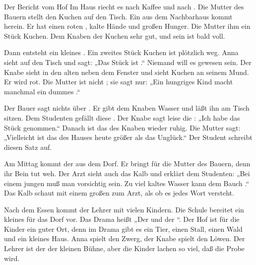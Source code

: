 \documentclass[12pt]{nextbook}
\begin{document}
\begin{readersection}{Der Bericht vom Hof}
Im Haus riecht es nach Kaffee und nach . Die Mutter des Bauern stellt den Kuchen auf den Tisch. Ein  aus dem Nachbarhaus kommt herein. Er hat einen roten , kalte Hände und großen Hunger. Die Mutter  ihm ein Stück Kuchen. Dem Knaben  der Kuchen sehr gut, und sein  ist bald voll.

Dann entsteht ein kleines . Ein zweites Stück Kuchen ist plötzlich weg. Anna sieht auf den Tisch und sagt: „Das Stück ist .“ Niemand will es gewesen sein. Der Knabe sieht in den alten  neben dem Fenster und sieht Kuchen an seinem Mund. Er wird rot. Die Mutter ist nicht ; sie sagt nur: „Ein hungriges Kind macht manchmal ein dummes .“

Der Bauer sagt nichts über . Er gibt dem Knaben Wasser und läßt ihn am Tisch sitzen. Dem Studenten gefällt diese . Der Knabe sagt leise die : „Ich habe das Stück genommen.“ Danach ist das  des Knaben wieder ruhig. Die Mutter sagt: „Vielleicht ist das  des Hauses heute größer als das Unglück.“ Der Student schreibt diesen Satz auf.

Am Mittag kommt der  aus dem Dorf. Er bringt  für die Mutter des Bauern, denn ihr Bein tut weh. Der Arzt sieht auch das Kalb und erklärt dem Studenten: „Bei einem jungen  muß man vorsichtig sein. Zu viel kaltes Wasser kann dem Bauch .“ Das Kalb schaut mit einem großen  zum Arzt, als ob es jedes Wort versteht.

Nach dem Essen kommt der Lehrer mit vielen Kindern. Die Schule bereitet ein kleines  für das Dorf vor. Das Drama heißt „Der  und der “. Der Hof ist für die Kinder ein guter Ort, denn im Drama gibt es ein Tier, einen Stall, einen Wald und ein kleines Haus. Anna spielt den Zwerg, der Knabe spielt den Löwen. Der Lehrer ist der  der kleinen Bühne, aber die Kinder lachen so viel, daß die Probe  wird.


\end{readersection}
\end{document}
